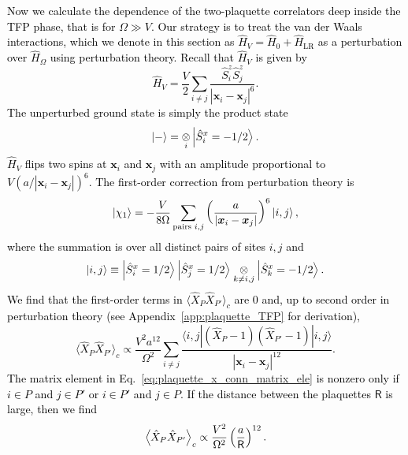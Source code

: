 \documentclass[twocolumn,superscriptaddress,amsmath,amssymb,aps,prx,nofootinbib]{revtex4-2}
\newcommand{\newtext}[1]{\textcolor{black}{#1}}
\begin{document}
\newtext{Now we calculate the dependence of the two-plaquette correlators deep inside the TFP phase, that is for $\Omega \gg V$. Our strategy is to treat the van der Waals interactions, which we denote in this section as $\hat{H}_V = \hat{H}_0 + \hat{H}_{\text{LR}}$ as a perturbation over $\hat{H}_\Omega$ using  perturbation theory. Recall that $\hat{H}_V$ is given by 
\begin{equation}
\label{eq:H_V}
    \hat{H}_V = \frac{V}{2} \sum_{i\neq j} \frac{\hat{S}_i^z \hat{S}_j^z}{|\bm{x}_i - \bm{x}_j|^6}.
\end{equation}
The unperturbed ground state is simply the product state
\begin{equation}
\label{eq:minus_state_def}
    \ket{-} =  \underset{i}{\otimes} \ket{\hat{S}^x_i = -1/2}.
\end{equation}
$\hat{H}_V$ flips two spins at $\bm{x}_i$ and $\bm{x}_j$ with an amplitude proportional to $V \left( a /|\bm{x}_i - \bm{x}_j | \right)^6$. The first-order correction from perturbation theory is
\begin{equation}
\label{eq:tfp_state_pert1}
    \ket{\chi_1} = -\frac{V}{8\Omega} \sum_{\text{pairs }i,j} \left( \frac{a}{|\bm{x}_i -\bm{x}_j|} \right)^6 \ket{i,j} ,
\end{equation}
where the summation is over all distinct pairs of sites $i, j$ and
\begin{equation}
    \ket{i,j} \equiv \ket{\hat{S}^x_i = 1/2}\ket{\hat{S}^x_j = 1/2} \underset{k \neq i,j}{\otimes}  \ket{\hat{S}^x_k = -1/2}.
\end{equation}
We find that the first-order terms in $\langle \hat{X}_P \hat{X}_{P'} \rangle_c$ are 0 and, up to second order in perturbation theory (see Appendix~\ref{app:plaquette_TFP} for derivation),
\begin{equation}
\label{eq:plaquette_x_conn_matrix_ele}
        \langle \hat{X}_P \hat{X}_{P'}  \rangle_{c} \propto \frac{V^2 a^{12}}{ \Omega^2}  \sum_{i\neq j} \frac{\langle i, j | \left( \hat{X}_P -1\right) \left(   \hat{X}_{P'} -1 \right) | i, j \rangle }{| \bm{x}_i - \bm{x}_j|^{12} }.
\end{equation}
The matrix element in Eq.~\eqref{eq:plaquette_x_conn_matrix_ele} is nonzero only if $i \in P$ and $j \in P'$ or $i \in P'$ and $j \in P$. 
If the distance between the plaquettes $\mathsf{R}$ is large, then we find
\begin{equation}
\label{eq:deep_tfp_state}
    \expval{ \hat{X}_P \hat{X}_{P'} }_{c} \propto \frac{V^2}{\Omega^2 } \left( \frac{a}{\mathsf{R}} \right)^{12}.
\end{equation}}
\end{document}
